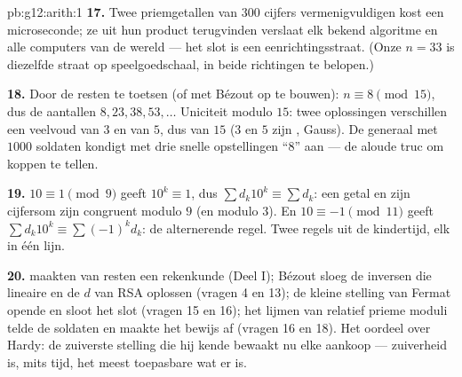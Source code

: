 \begin{solution}{pb:g12:arith:1}
\textbf{17.} Twee priemgetallen van $300$ cijfers vermenigvuldigen kost een
microseconde; ze uit hun product terugvinden verslaat elk bekend algoritme en
alle computers van de wereld --- het slot is een eenrichtingsstraat. (Onze
$n = 33$ is diezelfde straat op speelgoedschaal, in beide richtingen te
belopen.)

\textbf{18.} Door de resten te toetsen (of met Bézout op te bouwen):
$n \equiv 8 \pmod{15}$, dus de aantallen $8, 23, 38, 53, \dots$ Uniciteit
modulo $15$: twee oplossingen verschillen een veelvoud van $3$ en van $5$, dus
van $15$ ($3$ en $5$ zijn , Gauss). De generaal met $1000$
soldaten kondigt met drie snelle opstellingen ``$8$'' aan --- de aloude truc
om koppen te tellen.

\textbf{19.} $10 \equiv 1 \pmod 9$ geeft $10^k \equiv 1$, dus
$\sum d_k 10^k \equiv \sum d_k$: een getal en zijn cijfersom zijn congruent
modulo $9$ (en modulo $3$). En $10 \equiv -1 \pmod{11}$ geeft
$\sum d_k 10^k \equiv \sum (-1)^k d_k$: de alternerende regel. Twee regels uit
de kindertijd, elk in één lijn.

\textbf{20.}  maakten van resten een rekenkunde (Deel I); Bézout
sloeg de inversen die lineaire  en de $d$ van RSA oplossen (vragen
4 en 13); de kleine stelling van Fermat opende en sloot het slot (vragen 15 en
16); het lijmen van relatief prieme moduli telde de soldaten en maakte het
bewijs af (vragen 16 en 18). Het oordeel over Hardy: de zuiverste stelling die
hij kende bewaakt nu elke aankoop --- zuiverheid is, mits tijd, het meest
toepasbare wat er is.
\end{solution}
